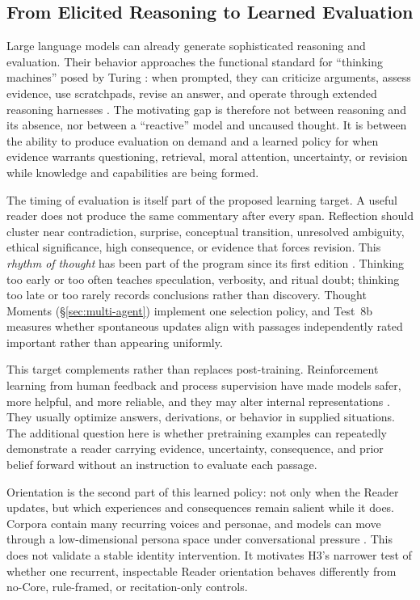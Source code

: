 \documentclass[11pt]{article}
\begin{document}
\subsection{From Elicited Reasoning to Learned Evaluation}
\label{sec:learned-evaluation}

Large language models can already generate sophisticated reasoning and
evaluation. Their behavior approaches the functional standard for ``thinking
machines'' posed by Turing \cite{turing1950computing}: when prompted, they can
criticize arguments, assess evidence, use scratchpads, revise an answer, and
operate through extended reasoning harnesses
\cite{brown2020language,nye2021scratchpads,zelikman2022star,deepseek2025r1}.
The motivating gap is therefore not between reasoning and its absence, nor
between a ``reactive'' model and uncaused thought. It is between the ability to
produce evaluation on demand and a learned policy for when evidence warrants
questioning, retrieval, moral attention, uncertainty, or revision while
knowledge and capabilities are being formed.

The timing of evaluation is itself part of the proposed learning target. A
useful reader does not produce the same commentary after every span. Reflection
should cluster near contradiction, surprise, conceptual transition, unresolved
ambiguity, ethical significance, high consequence, or evidence that forces
revision. This \emph{rhythm of thought} has been part of the program since its
first edition \cite{westerberg2025superintelligence}. Thinking too early or too
often teaches speculation, verbosity, and ritual doubt; thinking too late or
too rarely records conclusions rather than discovery. Thought Moments
(\S\ref{sec:multi-agent}) implement one selection policy, and Test~8b measures
whether spontaneous updates align with passages independently rated important
rather than appearing uniformly.

This target complements rather than replaces post-training. Reinforcement
learning from human feedback and process supervision have made models safer,
more helpful, and more reliable, and they may alter internal representations
\cite{christiano2017deep,lightman2023letsverify}. They usually optimize answers,
derivations, or behavior in supplied situations. The additional question here
is whether pretraining examples can repeatedly demonstrate a reader carrying
evidence, uncertainty, consequence, and prior belief forward without an
instruction to evaluate each passage.

Orientation is the second part of this learned policy: not only when the Reader
updates, but which experiences and consequences remain salient while it does.
Corpora contain many recurring voices and personae, and models can move through a
low-dimensional persona space under conversational pressure
\cite{lu2026assistantaxissituatingstabilizing}. This does not validate a stable
identity intervention. It motivates H3's narrower test of whether one recurrent,
inspectable Reader orientation behaves differently from no-Core, rule-framed,
or recitation-only controls.
\end{document}
